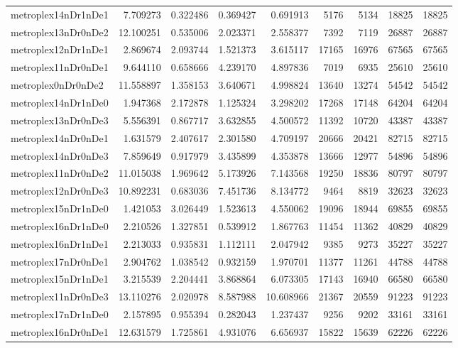 \begin{longtable}{|l|r|r|r|r|r|r|r|r|}
metroplex14nDr1nDe1 & 7.709273 & 0.322486 & 0.369427 & 0.691913 & 5176 & 5134 & 18825 & 18825 \\
metroplex13nDr0nDe2 & 12.100251 & 0.535006 & 2.023371 & 2.558377 & 7392 & 7119 & 26887 & 26887 \\
metroplex12nDr1nDe1 & 2.869674 & 2.093744 & 1.521373 & 3.615117 & 17165 & 16976 & 67565 & 67565 \\
metroplex11nDr0nDe1 & 9.644110 & 0.658666 & 4.239170 & 4.897836 & 7019 & 6935 & 25610 & 25610 \\
metroplex0nDr0nDe2 & 11.558897 & 1.358153 & 3.640671 & 4.998824 & 13640 & 13274 & 54542 & 54542 \\
metroplex14nDr1nDe0 & 1.947368 & 2.172878 & 1.125324 & 3.298202 & 17268 & 17148 & 64204 & 64204 \\
metroplex13nDr0nDe3 & 5.556391 & 0.867717 & 3.632855 & 4.500572 & 11392 & 10720 & 43387 & 43387 \\
metroplex14nDr0nDe1 & 1.631579 & 2.407617 & 2.301580 & 4.709197 & 20666 & 20421 & 82715 & 82715 \\
metroplex14nDr0nDe3 & 7.859649 & 0.917979 & 3.435899 & 4.353878 & 13666 & 12977 & 54896 & 54896 \\
metroplex11nDr0nDe2 & 11.015038 & 1.969642 & 5.173926 & 7.143568 & 19250 & 18836 & 80797 & 80797 \\
metroplex12nDr0nDe3 & 10.892231 & 0.683036 & 7.451736 & 8.134772 & 9464 & 8819 & 32623 & 32623 \\
metroplex15nDr1nDe0 & 1.421053 & 3.026449 & 1.523613 & 4.550062 & 19096 & 18944 & 69855 & 69855 \\
metroplex16nDr1nDe0 & 2.210526 & 1.327851 & 0.539912 & 1.867763 & 11454 & 11362 & 40829 & 40829 \\
metroplex16nDr1nDe1 & 2.213033 & 0.935831 & 1.112111 & 2.047942 & 9385 & 9273 & 35227 & 35227 \\
metroplex17nDr0nDe1 & 2.904762 & 1.038542 & 0.932159 & 1.970701 & 11377 & 11261 & 44788 & 44788 \\
metroplex15nDr1nDe1 & 3.215539 & 2.204441 & 3.868864 & 6.073305 & 17143 & 16940 & 66580 & 66580 \\
metroplex11nDr0nDe3 & 13.110276 & 2.020978 & 8.587988 & 10.608966 & 21367 & 20559 & 91223 & 91223 \\
metroplex17nDr1nDe0 & 2.157895 & 0.955394 & 0.282043 & 1.237437 & 9256 & 9202 & 33161 & 33161 \\
metroplex16nDr0nDe1 & 12.631579 & 1.725861 & 4.931076 & 6.656937 & 15822 & 15639 & 62226 & 62226 \\

\end{longtable}
